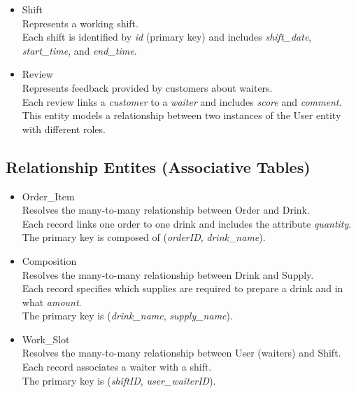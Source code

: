 \documentclass[a4paper]{article}
\begin{document}
\begin{itemize}
  Attributes include \emph{date}, \emph{start\_time}, \emph{end\_time},
  and \emph{n\_people}.\\
  Each reservation is associated with exactly one customer
  (\emph{user\_customerID}) and one table (\emph{tableNumber}).
\item
  Shift\\
  Represents a working shift.\\
  Each shift is identified by \emph{id} (primary key) and includes
  \emph{shift\_date}, \emph{start\_time}, and \emph{end\_time}.
\item
  Review\\
  Represents feedback provided by customers about waiters.\\
  Each review links a \emph{customer} to a \emph{waiter} and includes
  \emph{score} and \emph{comment}.\\
  This entity models a relationship between two instances of the User
  entity with different roles.
\end{itemize}




\subsection{Relationship Entites (Associative Tables)}
\label{sect:entites}

\begin{itemize}
\item
  Order\_Item\\
  Resolves the many-to-many relationship between Order and Drink.\\
  Each record links one order to one drink and includes the attribute
  \emph{quantity}.\\
  The primary key is composed of (\emph{orderID}, \emph{drink\_name}).
\item
  Composition\\
  Resolves the many-to-many relationship between Drink and Supply.\\
  Each record specifies which supplies are required to prepare a drink
  and in what \emph{amount}.\\
  The primary key is (\emph{drink\_name}, \emph{supply\_name}).
\item
  Work\_Slot\\
  Resolves the many-to-many relationship between User (waiters) and
  Shift.\\
  Each record associates a waiter with a shift.\\
  The primary key is (\emph{shiftID}, \emph{user\_waiterID}).
\end{itemize}
\end{document}
